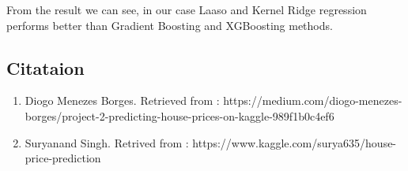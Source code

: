 \documentclass[11pt]{article}
\begin{document}
    From the result we can see, in our case Laaso and Kernel Ridge
regression performs better than Gradient Boosting and XGBoosting
methods.

    \subsection{Citataion}\label{citataion}

    \begin{enumerate}
\def\labelenumi{\arabic{enumi}.}
\item
  Diogo Menezes Borges. Retrieved from :
  https://medium.com/diogo-menezes-borges/project-2-predicting-house-prices-on-kaggle-989f1b0c4ef6
\item
  Suryanand Singh. Retrived from :
  https://www.kaggle.com/surya635/house-price-prediction
\end{enumerate}


    
    
    
    
\end{document}

